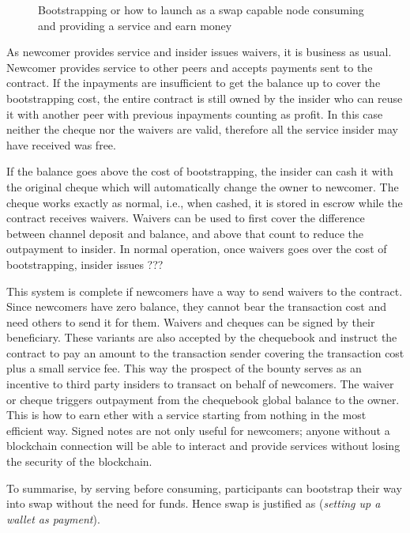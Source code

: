 \begin{center}
\begin{figure}
\begin{center}
\end{center}
\caption{Bootstrapping or how to launch as a swap capable node consuming and providing a
service  and earn money}
\label{fig:bootstrapping}
\end{figure}
\end{center}


As newcomer provides service and insider issues waivers, it is business as usual.
Newcomer provides service to other peers and accepts payments sent to the
contract. If the inpayments are insufficient to get the balance up
to cover the bootstrapping cost, the entire contract is still owned by the insider
who can reuse it with another peer with previous inpayments counting as profit.
In this case neither the cheque nor the waivers are valid, therefore all the service insider
may have received was free.

If the balance goes above the cost of bootstrapping, the insider can cash it with
the original cheque which will automatically change the owner to newcomer.
The cheque works exactly as normal, i.e., when cashed, it is stored in escrow
while the contract receives waivers.
Waivers can be used to first cover the difference between channel deposit and balance, and above that
count to reduce the outpayment to insider. In normal operation, once waivers goes over
the cost of bootstrapping, insider issues ???

This system is complete if newcomers have a way to send waivers to the contract.
Since newcomers have zero balance, they cannot bear the transaction   cost and need others to send it for them. 
Waivers and cheques can be signed by their beneficiary. These variants are also accepted by the chequebook
and instruct the contract to pay an amount to the transaction sender covering the transaction cost plus a small service fee.  This way the prospect of the bounty serves as an incentive to
third party insiders to transact on behalf of newcomers.
The waiver or cheque triggers outpayment from the chequebook global  balance to the owner.
This is how to earn ether with a service starting from nothing in the most efficient way.
Signed notes are not only useful for newcomers; anyone without a blockchain connection
will be able to interact and provide services without losing the security of the blockchain.

To summarise, by serving before consuming, participants can
bootstrap their way into swap without the need for funds.
Hence swap is justified as (\emph{setting up a wallet as payment}).
